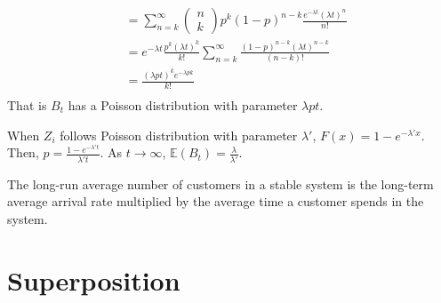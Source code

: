 \documentclass[11pt]{elegantbook}
\begin{document}
\begin{example}
\begin{solution}
\begin{equation}
\begin{aligned}
        &=\sum_{n=k}^\infty \begin{pmatrix}
            n\\
            k
        \end{pmatrix}p^k(1-p)^{n-k}\frac{e^{-\lambda t}(\lambda t)^n}{n!}\\
        &=e^{-\lambda t}\frac{p^k(\lambda t)^k}{k!}\sum_{n=k}^\infty\frac{(1-p)^{n-k}(\lambda t)^{n-k}}{(n-k)!}\\
        &=\frac{(\lambda p t)^ke^{-\lambda pk}}{k!}\\
    \end{aligned}
    \nonumber
\end{equation}
That is $B_t$ has a Poisson distribution with parameter $\lambda p t$.
\end{solution}
When $Z_i$ follows Poisson distribution with parameter $\lambda'$, $F(x)=1-e^{-\lambda'x}$. Then, $p=\frac{1-e^{-\lambda't}}{\lambda't}$. As $t \rightarrow \infty$, $\mathbb{E}(B_t)=\frac{\lambda}{\lambda'}$.

\begin{claim}
    The long-run average number of customers in a stable system is the long-term average arrival rate multiplied by the average time a customer spends in the system.
\end{claim}
\end{example}

\section{Superposition}
\end{document}
